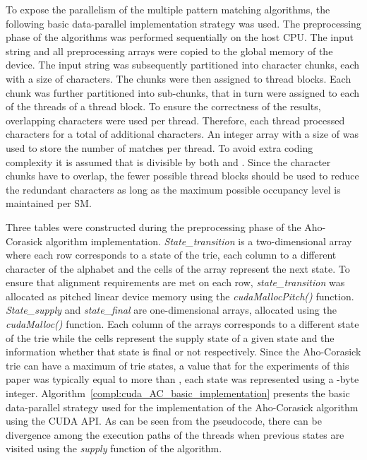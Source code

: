 \documentclass{ws-ijait}
\begin{document}
To expose the parallelism of the multiple pattern matching algorithms, the following basic data-parallel implementation strategy was used. The preprocessing phase of the algorithms was performed sequentially on the host CPU. The input string and all preprocessing arrays were copied to the global memory of the device. The input string was subsequently partitioned into  character chunks, each with a size  of  characters. The chunks were then assigned to  thread blocks. Each chunk was further partitioned into  sub-chunks, that in turn were assigned to each of the  threads of a thread block. To ensure the correctness of the results,  overlapping characters were used per thread. Therefore, each thread processed  characters for a total of  additional characters. An integer array  with a size of  was used to store the number of matches per thread. To avoid extra coding complexity it is assumed that  is divisible by both  and . Since the character chunks have to overlap, the fewer possible thread blocks should be used to reduce the redundant characters as long as the maximum possible occupancy level is maintained per SM. 

Three tables were constructed during the preprocessing phase of the Aho-Corasick algorithm implementation. \textit{State\_transition} is a two-dimensional array where each row corresponds to a state of the trie, each column to a different character of the alphabet  and the cells of the array represent the next state. To ensure that alignment requirements are met on each row, \textit{state\_transition} was allocated as pitched linear device memory using the \textit{cudaMallocPitch()} function. \textit{State\_supply} and \textit{state\_final} are one-dimensional arrays, allocated using the \textit{cudaMalloc()} function. Each column of the arrays corresponds to a different state of the trie while the cells represent the supply state of a given state and the information whether that state is final or not respectively. Since the Aho-Corasick trie can have a maximum of  trie states, a value that for the experiments of this paper was typically equal to more than , each state was represented using a -byte integer. Algorithm~\ref{compl:cuda_AC_basic_implementation} presents the basic data-parallel strategy used for the implementation of the Aho-Corasick algorithm using the CUDA API. As can be seen from the pseudocode, there can be divergence among the execution paths of the threads when previous states are visited using the \textit{supply} function of the algorithm.
\end{document}
